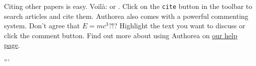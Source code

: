 Citing other papers is easy. Voilà: \cite{2012} or \cite{Holstein_2009}. Click on the \verb|cite| button in the toolbar to search articles and cite them. Authorea also comes with a powerful commenting system. Don't agree that $E  =  mc^{3}$?!? Highlight the text you want to discuss or click the comment button. Find out more about using Authorea on \href{https://www.authorea.com/help}{our help page}.

'''
    
    